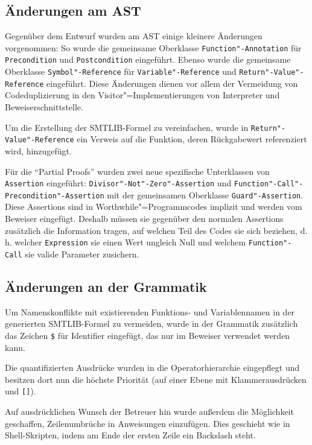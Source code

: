 \subsection{Änderungen am AST}

Gegenüber dem Entwurf wurden am AST einige kleinere Änderungen vorgenommen: So wurde die gemeinsame Oberklasse \texttt{Function"-Annotation} für \texttt{Precondition} und \texttt{Postcondition} eingeführt. Ebenso wurde die gemeinsame Oberklasse \texttt{Symbol"-Reference} für \texttt{Variable"-Reference}  und \texttt{Return"-Value"-Reference} eingeführt. Diese Änderungen dienen vor allem der Vermeidung von Codeduplizierung in den Visitor"=Implementierungen von Interpreter und Beweiserschnittstelle.

Um die Erstellung der SMTLIB-Formel zu vereinfachen, wurde in \texttt{Return"-Value"-Reference} ein Verweis auf die Funktion, deren Rückgabewert referenziert wird, hinzugefügt.

Für die "`Partial Proofs"' wurden zwei neue spezifische Unterklassen von \texttt{Assertion} eingeführt: \texttt{Divisor"-Not"-Zero"-Assertion} und \texttt{Function"-Call"-Precondition"-Assertion} mit der gemeinsamen Oberklasse \texttt{Guard"-Assertion}. Diese Assertions sind in Worthwhile"=Programmcodes implizit und werden vom Beweiser eingefügt. Deshalb müssen sie gegenüber den normalen Assertions zusätzlich die Information tragen, auf welchen Teil des Codes sie sich beziehen, d.\,h. welcher \texttt{Expression} sie einen Wert ungleich Null und welchem \texttt{Function"-Call} sie valide Parameter zusichern.

\subsection{Änderungen an der Grammatik}

Um Namenskonflikte mit existierenden Funktions- und Variablennamen in der generierten SMTLIB-Formel zu vermeiden, wurde in der Grammatik zusätzlich das Zeichen \texttt{\$} für Identifier eingefügt, das nur im Beweiser verwendet werden kann.

Die quantifizierten Ausdrücke wurden in die Operatorhierarchie eingepflegt und besitzen dort nun die höchste Priorität (auf einer Ebene mit Klammerausdrücken und \texttt{[]}).

Auf ausdrücklichen Wunsch der Betreuer hin wurde außerdem die Möglichkeit geschaffen, Zeilenumbrüche in Anweisungen einzufügen. Dies geschieht wie in Shell-Skripten, indem am Ende der ersten Zeile ein Backslash steht.
